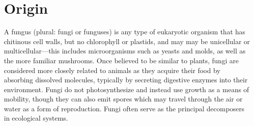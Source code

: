 \section{Origin}
\label{8}

A fungus (plural: fungi or funguses) is any type of eukaryotic organism that has chitinous cell walls, but no chlorophyll or plastids, and may may be unicellular or multicellular{\mbox{$\text{---}$}}this includes microorganisms such as yeasts and molds, as well as the more familiar mushrooms. Once believed to be similar to plants, fungi are considered more closely related to animals as they acquire their food by absorbing dissolved molecules, typically by secreting digestive enzymes into their environment. Fungi do not photosynthesize and instead use growth as a means of mobility, though they can also emit spores which may travel through the air or water as a form of reproduction. Fungi often serve as the principal decomposers in ecological systems.


